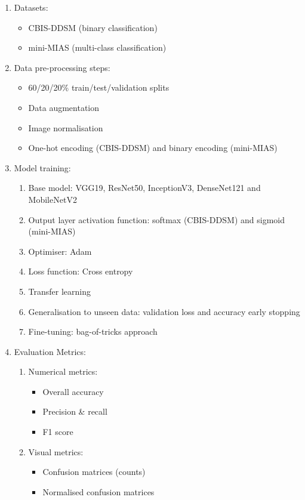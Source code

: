 \begin{enumerate}
    \item Datasets:
    \begin{itemize}
        \item CBIS-DDSM (binary classification)
        \item mini-MIAS (multi-class classification)
    \end{itemize}
    
    \item Data pre-processing steps:
    \begin{itemize}
        \item 60/20/20\% train/test/validation splits
        \item Data augmentation
        \item Image normalisation
        \item One-hot encoding (CBIS-DDSM) and binary encoding (mini-MIAS)
    \end{itemize}
    
    \item Model training:
     \begin{enumerate}
        \item Base model: VGG19, ResNet50, InceptionV3, DenseNet121 and MobileNetV2 
        \item Output layer activation function: softmax (CBIS-DDSM) and sigmoid (mini-MIAS)
        \item Optimiser: Adam
        \item Loss function: Cross entropy
        \item Transfer learning
        \item Generalisation to unseen data: validation loss and accuracy early stopping
        \item Fine-tuning: bag-of-tricks approach
    \end{enumerate}
    
    \item Evaluation Metrics:
    \begin{enumerate}
        \item Numerical metrics:
        \begin{itemize}
            \item Overall accuracy
            \item Precision \& recall
            \item F1 score
        \end{itemize}
        \item Visual metrics:
        \begin{itemize}
            \item Confusion matrices (counts)
            \item Normalised confusion matrices
        \end{itemize}
    \end{enumerate}
    

\end{enumerate}
